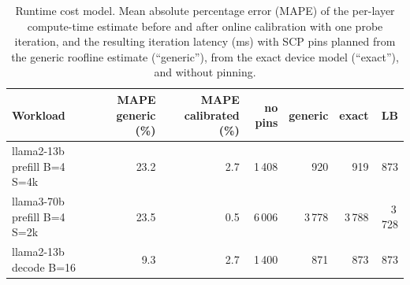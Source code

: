 \begin{table}[t]
\centering
\caption{Runtime cost model. Mean absolute percentage error (MAPE) of the per-layer compute-time estimate before and after online calibration with one probe iteration, and the resulting iteration latency (ms) with SCP pins planned from the generic roofline estimate (``generic''), from the exact device model (``exact''), and without pinning.}
\label{tab:costmodel}
\small
\begin{tabular}{lrrrrrr}
\toprule
\textbf{Workload} & \textbf{MAPE generic (\%)} & \textbf{MAPE calibrated (\%)} & \textbf{no pins} & \textbf{generic} & \textbf{exact} & \textbf{LB}\\
\midrule
llama2-13b prefill B=4 S=4k & 23.2 & 2.7 & 1\,408 & 920 & 919 & 873\\
llama3-70b prefill B=4 S=2k & 23.5 & 0.5 & 6\,006 & 3\,778 & 3\,788 & 3\,728\\
llama2-13b decode B=16 & 9.3 & 2.7 & 1\,400 & 871 & 873 & 873\\
\bottomrule
\end{tabular}
\end{table}
